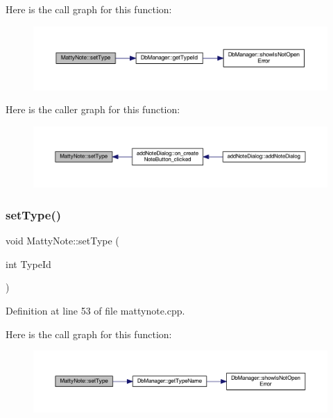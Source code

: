 Here is the call graph for this function\+:
\nopagebreak
\begin{figure}[H]
\begin{center}
\leavevmode
\includegraphics[width=350pt]{classMattyNote_ac9171fd4faaf0c286c9315a0b4ef4560_cgraph}
\end{center}
\end{figure}
Here is the caller graph for this function\+:
\nopagebreak
\begin{figure}[H]
\begin{center}
\leavevmode
\includegraphics[width=350pt]{classMattyNote_ac9171fd4faaf0c286c9315a0b4ef4560_icgraph}
\end{center}
\end{figure}
\hypertarget{classMattyNote_a8ae86d728b9cb64fa78042a09cb5aa70}{}\label{classMattyNote_a8ae86d728b9cb64fa78042a09cb5aa70} 
\subsubsection{\texorpdfstring{set\+Type()}{setType()}\hspace{0.1cm}{\footnotesize\ttfamily [2/2]}}
{\footnotesize\ttfamily void Matty\+Note\+::set\+Type (\begin{DoxyParamCaption}\item[{int}]{Type\+Id }\end{DoxyParamCaption})}



Definition at line 53 of file mattynote.\+cpp.

Here is the call graph for this function\+:
\nopagebreak
\begin{figure}[H]
\begin{center}
\leavevmode
\includegraphics[width=350pt]{classMattyNote_a8ae86d728b9cb64fa78042a09cb5aa70_cgraph}
\end{center}
\end{figure}


